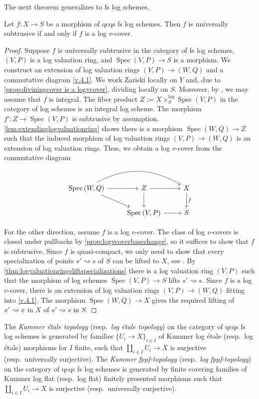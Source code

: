 \documentclass[10pt]{amsart}
\DeclareMathOperator{\Spec}{Spec}
\begin{document}
The next theorem generalizes \cite[Corollary 2.9]{Rydh} to fs log schemes. 
\begin{theorem}\label{thm:mainsubtrusive}
Let $f \colon X \to S$ be a morphism of qcqs fs log schemes.
Then $f$ is universally subtrusive if and only if $f$ is a log $v$-cover.
\end{theorem}
\begin{proof}
Suppose $f$ is universally subtrusive in the category of fs log schemes, 
$(V,P)$ is a log valuation ring,
and $\Spec{(V,P)} \to S$ is a morphism.
We construct an extension of log valuation rings $(V,P)\to (W,Q)$ and a commutative diagram \eqref{v.4.1}.
We work Zariski locally on $Y$ and, 
due to \cref{prop:diviningcover is a logvcover}, 
dividing locally on $S$. 
Moreover, 
by \cite[Theorem 1.1]{MR1754621},
we may assume that $f$ is integral.
The fiber product $Z := X \times_S^{\log} \Spec{(V,P)}$ in the category of log schemes 
is an integral log scheme. 
The morphism $f' \colon Z \to \Spec{(V,P)}$ is subtrusive by assumption. 
\cref{lem:extendinglogvaluationring} shows
there is a morphism $\Spec(W,Q)\to Z$ such that the induced morphism of log valuation rings 
$(V,P)\to (W,Q)$ is an extension of log valuation rings. 
Thus, 
we obtain a log $v$-cover from the commutative diagram
$$
\begin{tikzcd}
\Spec{(W,Q)} \ar[r]  \ar[rr, bend left] \ar[rd]&
Z \ar[r] \ar[d] & X \ar[d, "f"] \\
&\Spec{(V,P)} \ar[r] & S
\end{tikzcd}
$$

For the other direction,
assume $f$ is a log $v$-cover.
The class of log $v$-covers is closed under pullbacks by \cref{prop:logvcoverbasechange},
so it suffices to show that $f$ is subtrusive.
Since $f$ is quasi-compact, 
we only need to show that every specialization of points $s' \rightsquigarrow s$ of $S$ 
can be lifted to $X$,
see \cite[Remark 2.5]{Rydh}.
By \cref{thm:logvaluationringsliftspecializations} there is a log valuation ring $(V,P)$ such that the 
morphism of log schemes $\Spec{(V,P)} \to S$ lifts $s' \rightsquigarrow s.$
Since $f$ is a log $v$-cover, 
there is an extension of log valuation rings $(V,P)\to (W,Q)$ fitting into \eqref{v.4.1}.
The morphism $\Spec(W,Q)\to X$ gives the required lifting of $x' \rightsquigarrow x$ in $X$ of 
$s' \rightsquigarrow s$ in $S$. 
\end{proof}

The \emph{Kummer \'etale topology} (resp.\ \emph{log \'etale topology}) 
on the category of qcqs fs log schemes is generated by families 
$\{U_i\to X\}_{i\in I}$ of Kummer log \'etale (resp.\ log \'etale) morphisms 
for $I$ finite, such that $\amalg_{i\in I} U_i\to X$ is surjective 
(resp.\ universally surjective).
The \emph{Kummer fppf-topology} (resp.\ \emph{log fppf-topology}) 
on the category of qcqs fs log schemes is generated by finite covering families of Kummer log flat 
(resp.\ log flat) finitely presented morphisms such that $\amalg_{i\in I} U_i\to X$ 
is surjective (resp.\ universally surjective).
\end{document}

